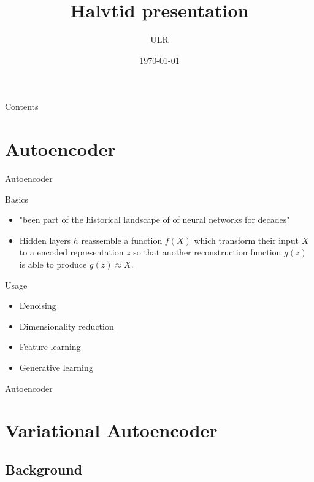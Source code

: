 \documentclass{beamer}
\title{Halvtid presentation}
\author{ULR}
\institute{HIS}
\date{\today}
\begin{document}
\frame{\titlepage}
\begin{frame}{Contents}
    \tableofcontents
\end{frame}


\section{Autoencoder}
\begin{frame}{Autoencoder}
    \begin{block}{Basics}
        \begin{itemize}
            \item "been part of the historical landscape of of neural networks for decades"\cite{Goodfellow-et-al-2016}
            \item Hidden layers $h$ reassemble a function $f(X)$ which transform their input $X$ to a encoded
                representation $z$ so that another reconstruction function $g(z)$ is able to produce $g(z) \approx X$.
        \end{itemize}    
    \end{block}
    \begin{block}{Usage}
        \begin{itemize}
            \item Denoising
            \item Dimensionality reduction
            \item Feature learning
            \item Generative learning
        \end{itemize}
    \end{block}
\end{frame}

\begin{frame}{Autoencoder}
    \resizebox{\textwidth}{!}{}
\end{frame}

\section{Variational Autoencoder}
\subsection{Background}
\end{document}
